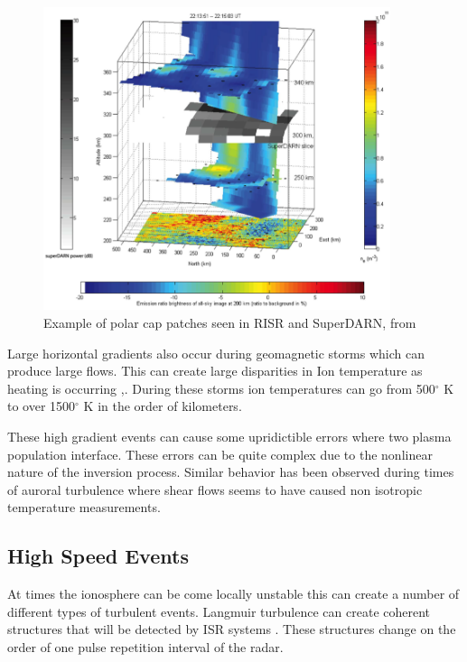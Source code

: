 \begin{figure}[!t]
\centering
\includegraphics[width=4.0in]{patches}
\caption{Example of polar cap patches seen in RISR and SuperDARN, from \cite{Dahlgren:2012dq}}
\label{fig:patches}
\end{figure}

Large horizontal gradients also occur during geomagnetic storms which can produce large flows.  This can create large disparities in Ion temperature as heating is occurring \cite{Zettergren:2008ba},\cite{semeter:plasmatransport2012}.  During these storms ion temperatures can go from 500$^\circ$ K to over 1500$^\circ$ K in the order of kilometers.

These high gradient events can cause some upridictible errors where two plasma population interface.  These errors can be quite complex due to the nonlinear nature of the inversion process\cite{Vallinkoski1990665}.  Similar behavior has been observed during times of auroral turbulence where shear flows seems to have caused non isotropic temperature measurements\cite{knudsen1993}. 
\subsection*{High Speed Events}
At times the ionosphere can be come locally unstable this can create a number of different types of turbulent events. Langmuir turbulence can create coherent structures that will be detected by ISR systems \cite{akbari:2013lt}.  These structures change on the order of one pulse repetition interval of the radar.

